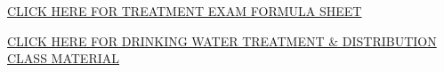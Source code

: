 \documentclass{article}
\begin{document}
\begin{tcolorbox}[width=17cm,box align=center, halign=center,  valign=center,colback={my-blue},title={}, colbacktitle=yellow,coltitle=blue]    
\href{https://drive.google.com/file/d/1lRYwYbRJnW6Vzmbuvdrygr838N5ZATNn/view?usp=sharing}{CLICK HERE FOR TREATMENT EXAM FORMULA SHEET}
\end{tcolorbox} 

%
%
%
%

\begin{tcolorbox}[width=17cm,box align=center, halign=center,  valign=center,colback={my-blue},title={}, colbacktitle=yellow,coltitle=blue]    
\href{https://sbasrai.github.io/WaterTreatmentandDistribution/WaterTreatmentandDistribution.html}{CLICK HERE FOR DRINKING WATER TREATMENT \& DISTRIBUTION CLASS MATERIAL}
\end{tcolorbox} 
\end{document}
